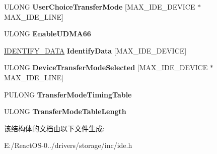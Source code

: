 \begin{DoxyCompactItemize}
\mbox{\label{struct___p_c_i_i_d_e___t_r_a_n_s_f_e_r___m_o_d_e___s_e_l_e_c_t_a0c125b56c9ca5ccca76c543bef623707}} 
U\+L\+O\+NG {\bfseries User\+Choice\+Transfer\+Mode} \mbox{[}M\+A\+X\+\_\+\+I\+D\+E\+\_\+\+D\+E\+V\+I\+CE $\ast$M\+A\+X\+\_\+\+I\+D\+E\+\_\+\+L\+I\+NE\mbox{]}
\item 
\mbox{\label{struct___p_c_i_i_d_e___t_r_a_n_s_f_e_r___m_o_d_e___s_e_l_e_c_t_a6602df92104798a55db5c53b003fad20}} 
U\+L\+O\+NG {\bfseries Enable\+U\+D\+M\+A66}
\item 
\mbox{\label{struct___p_c_i_i_d_e___t_r_a_n_s_f_e_r___m_o_d_e___s_e_l_e_c_t_af7f7a282612d6693edab0099230de129}} 
\hyperlink{struct___i_d_e_n_t_i_f_y___d_a_t_a}{I\+D\+E\+N\+T\+I\+F\+Y\+\_\+\+D\+A\+TA} {\bfseries Identify\+Data} \mbox{[}M\+A\+X\+\_\+\+I\+D\+E\+\_\+\+D\+E\+V\+I\+CE\mbox{]}
\item 
\mbox{\label{struct___p_c_i_i_d_e___t_r_a_n_s_f_e_r___m_o_d_e___s_e_l_e_c_t_a820225925a591edc7b70ea8eaf769144}} 
U\+L\+O\+NG {\bfseries Device\+Transfer\+Mode\+Selected} \mbox{[}M\+A\+X\+\_\+\+I\+D\+E\+\_\+\+D\+E\+V\+I\+CE $\ast$M\+A\+X\+\_\+\+I\+D\+E\+\_\+\+L\+I\+NE\mbox{]}
\item 
\mbox{\label{struct___p_c_i_i_d_e___t_r_a_n_s_f_e_r___m_o_d_e___s_e_l_e_c_t_ae3d19642804d8f9d1c76e7acfe3f7947}} 
P\+U\+L\+O\+NG {\bfseries Transfer\+Mode\+Timing\+Table}
\item 
\mbox{\label{struct___p_c_i_i_d_e___t_r_a_n_s_f_e_r___m_o_d_e___s_e_l_e_c_t_af464b8dac214e64d8f89585302e7cade}} 
U\+L\+O\+NG {\bfseries Transfer\+Mode\+Table\+Length}
\end{DoxyCompactItemize}


该结构体的文档由以下文件生成\+:\begin{DoxyCompactItemize}
\item 
E\+:/\+React\+O\+S-\/0../drivers/storage/inc/ide.\+h\end{DoxyCompactItemize}
